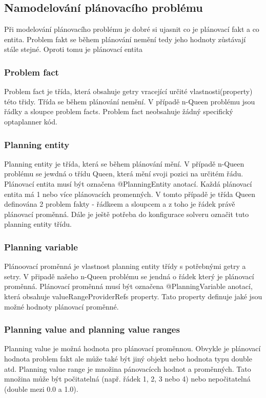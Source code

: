 \subsection{Namodelování plánovacího problému}
Při modelování plánovacího problému je dobré si ujasnit co je plánovací fakt a co entita. Problem fakt se během plánování nemění tedy jeho hodnoty zůstávají stále stejné. Oproti tomu je plánovací entita 
 
\subsubsection{Problem fact}
Problem fact je třída, která obsahuje getry vracející určité vlastnosti(property) této třidy. Třída se během plánování nemění. V případě n-Queen problému jsou řádky a sloupce problem facts. Problem fact neobsahuje žádný specifický optaplanner kód.

\subsubsection{Planning entity}
Planning entity je třída, která se během plánování mění. V případě n-Queen problému se jewdná o třídu Queen, která mění svoji pozici na určitém řádu. Plánovací entita musí být označena @PlanningEntity anotací. Každá plánovací entita má 1 nebo více plánovacích promenných.  V tomto případě je třída Queen definována 2 problem fakty - řádkeem a sloupcem a z toho je řádek právě plánovací proměnná. Dále je ještě potřeba do konfigurace solveru označit tuto planning entity třídu.

\subsubsection{Planning variable}
Plánoovací proměnná je vlastnost planning entity třídy s potřebnými getry a setry. V připadě našeho n-Queen problému se jendná o řádek který je plánovací proměnná. Plánovací proměnná musí být označena @PlanningVariable anotací, která obsahuje valueRangeProviderRefs property. Tato property definuje jaké jsou možné hodnoty plánovací proměnné. 

\subsubsection{Planning value and planning value ranges}
Planning value je možná hodnota pro plánovací proměnnou. Obvykle je plánovací hodnota problem fakt ale může také být jiný objekt nebo hodnota typu double atd. Planning value range je množina pánovacícch hodnot a proměnných. Tato množina může být počitatelná (např. řádek 1, 2, 3 nebo 4) nebo nepočitatelná (double mezi 0.0 a 1.0).

